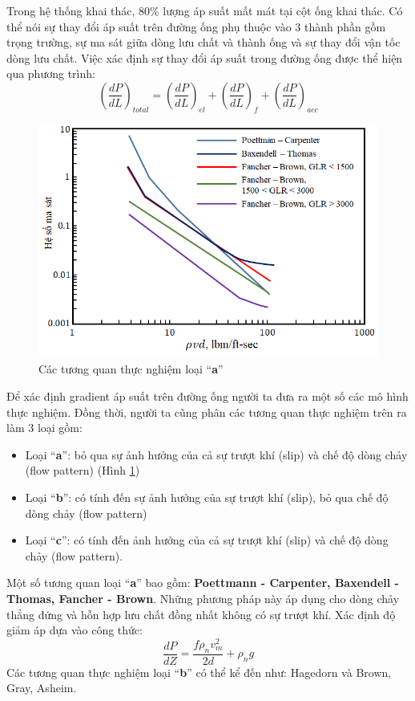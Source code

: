 \documentclass[12pt,a4paper]{report}
\begin{document}
Trong hệ thống khai thác, 80\% lượng áp suất mất mát tại cột ống khai thác. Có thể nói sự thay đổi áp suất trên đường ống phụ thuộc vào 3 thành phần gồm trọng trường, sự ma sát giữa dòng lưu chất và thành ống và sự thay đổi vận tốc dòng lưu chất. Việc xác định sự thay đổi áp suất trong đường ống được thể hiện qua phương trình:
	\begin{equation}
		\left(\dfrac{dP}{dL}\right)_{total} = \left(\dfrac{dP}{dL}\right)_{el} + \left(\dfrac{dP}{dL}\right)_{f} + \left(\dfrac{dP}{dL}\right)_{acc}
	\end{equation}
	\begin{figure}[h]
		\centering
		\includegraphics[scale=0.75]{Fig/category_a_friction_factor_corr.png}
		\caption[Các tương quan thực nghiệm loại “\textbf{a}”]{Các tương quan thực nghiệm loại “\textbf{a}” \cite{brill1999multiphase}}
		\label{fig:category_a_friction_factor_corr}
	\end{figure}
\newline
Để xác định gradient áp suất trên đường ống người ta đưa ra một số các mô hình thực nghiệm. Đồng thời, người ta cũng phân các tương quan thực nghiệm trên ra làm 3 loại gồm:
	\begin{itemize}
		\item Loại “\textbf{a}”: bỏ qua sự ảnh hưởng của cả sự trượt khí (slip) và chế độ dòng chảy (flow pattern) (Hình \ref{fig:category_a_friction_factor_corr})
		\item Loại “\textbf{b}”: có tính đến sự ảnh hưởng của sự trượt khí (slip), bỏ qua chế độ dòng chảy (flow pattern)
		\item Loại “\textbf{c}”: có tính đến ảnh hưởng của cả sự trượt khí (slip) và chế độ dòng chảy (flow pattern).
	\end{itemize}
Một số tương quan loại “\textbf{a}” bao gồm: \textbf{Poettmann - Carpenter, Baxendell - Thomas, Fancher - Brown}. Những phương pháp này áp dụng cho dòng chảy thẳng đứng và hỗn hợp lưu chất đồng nhất không có sự trượt khí. Xác định độ giảm áp dựa vào công thức:
	\begin{equation}
		\dfrac{dP}{dZ} = \dfrac{f\rho_{n}v_{m}^2}{2d} + \rho_{n}g
	\end{equation}
Các tương quan thực nghiệm loại “\textbf{b}” có thể kể đến như: Hagedorn và Brown, Gray, Asheim.\\
\end{document}
